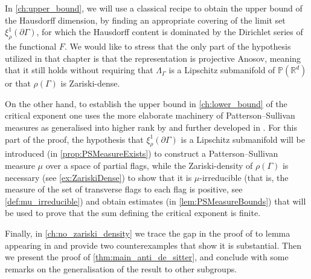 \documentclass{report}
\begin{document}
In \cref{ch:upper_bound}, we will use a classical recipe to obtain the upper bound of the Hausdorff dimension, by finding an appropriate covering of the limit set $\xi_\rho^1(\partial \Gamma)$, for which the Hausdorff content is dominated by the Dirichlet series of the functional $F$.
We would like to stress that the only part of the hypothesis utilized in that chapter is that the representation is projective Anosov, meaning that it still holds without requiring that $\Lambda_\Gamma$ is a Lipschitz submanifold of $\mathbb P(\mathbb R^d)$ or that $\rho(\Gamma)$ is Zariski-dense.

On the other hand, to establish the upper bound in \cref{ch:lower_bound} of the critical exponent one uses the more elaborate machinery of Patterson--Sullivan measures as generalised into higher rank by \cite{quint2002mesures} and further developed in \cite{pozzetti_anosov_2023}.
For this part of the proof, the hypothesis that $\xi_\rho^1(\partial \Gamma)$ is a Lipschitz submanifold will be introduced (in \cref{prop:PSMeasureExists}) to construct a Patterson--Sullivan measure $\mu$ over a space of partial flags, while the Zariski-density of $\rho(\Gamma)$ is necessary (see \cref{ex:ZariskiDense}) to show that it is $\mu$-irreducible (that is, the measure of the set of transverse flags to each flag is positive, see \cref{def:mu_irreducible}) and obtain estimates (in \cref{lem:PSMeasureBounds}) that will be used to prove that the sum defining the critical exponent is finite.

Finally, in \cref{ch:no_zariski_density} we trace the gap in the proof of \cite{pozzetti_anosov_2023} to lemma appearing in \cite{labourie_anosov_2006} and provide two counterexamples that show it is substantial.
Then we present the proof of \cref{thm:main_anti_de_sitter}, and conclude with some remarks on the generalisation of the result to other subgroups.
\end{document}
